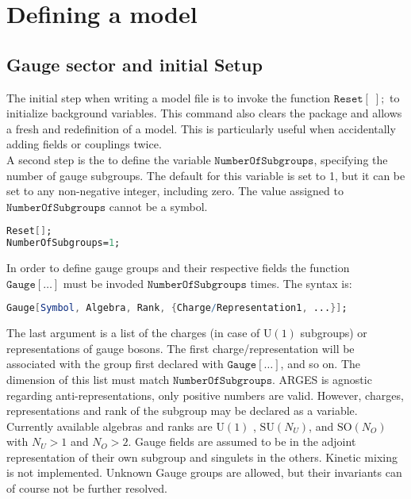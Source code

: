 \documentclass{scrartcl}
\begin{document}
\section{Defining a model}
\subsection{Gauge sector and initial Setup}
The initial step when writing a model file is to invoke the function $\mathtt{Reset[\;];}$ to initialize background variables. This command also clears the package and allows a fresh and redefinition of a model. This is particularly useful when accidentally adding fields or couplings twice. \\
A second step is the to define the variable $\mathtt{NumberOfSubgroups}$, specifying the number of gauge subgroups. The default for this variable is set to 1, but it can be set to any non-negative integer, including zero. The value assigned to $\mathtt{NumberOfSubgroups}$ cannot be a symbol.
\vspace{1em}
\begin{lstlisting}[language=mathematica,mathescape,columns=flexible,backgroundcolor=\color{light-gray}]
Reset[];
NumberOfSubgroups=1;
\end{lstlisting}
\vspace{1em}
In order to define gauge groups and their respective fields the function $\mathtt{Gauge[\dots]}$ must be invoded $\mathtt{NumberOfSubgroups}$ times. The syntax is:
\begin{lstlisting}[language=mathematica,mathescape,columns=flexible,backgroundcolor=\color{light-gray}]
Gauge[Symbol, Algebra, Rank, {Charge/Representation1, ...}];
\end{lstlisting}
The last argument is a list of the charges (in case of $\mathrm{U}(1)$ subgroups) or representations of gauge bosons. The first charge/representation will be associated with the group first declared with $\mathtt{Gauge[\dots]}$, and so on. The dimension of this list must match $\mathtt{NumberOfSubgroups}$. ARGES is agnostic regarding anti-representations, only positive numbers are valid. However, charges, representations and rank of the subgroup may be declared as a variable. \newline Currently available algebras and ranks are $\mathrm{U}(1)$ , $\mathrm{SU}(N_U)$, and $\mathrm{SO}(N_O)$ with $N_U > 1$ and $N_O > 2$. Gauge fields are assumed to be in the adjoint representation of their own subgroup and singulets in the others. Kinetic mixing is not implemented. \newline Unknown Gauge groups are allowed, but their invariants can of course not be further resolved.
\end{document}
